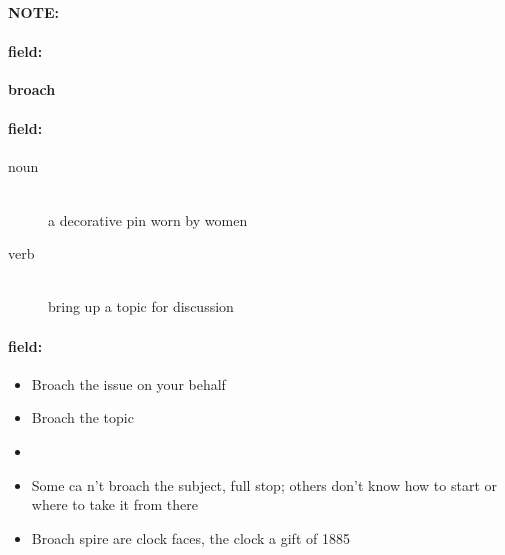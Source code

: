 \documentclass[12pt]{article}
\newenvironment{note}{\paragraph{NOTE:}}{}
\newenvironment{field}{\paragraph{field:}}{}
\begin{document}
\begin{note}
\begin{field}
\textbf{\large broach}
\end{field}


\begin{field}
\begin{description}
\item[noun] \hfill \\ 
a decorative pin worn by women

\item[verb] \hfill \\ 
bring up a topic for discussion

\end{description}
\end{field}

\begin{field}
\begin{itemize}
\item Broach the issue on your behalf
\item Broach the topic
\item 
\item Some ca n't broach the subject, full stop; others don't know how to start or where to take it from there
\item Broach spire are clock faces, the clock a gift of 1885
\end{itemize}
\end{field}
\end{note}
\end{document}
